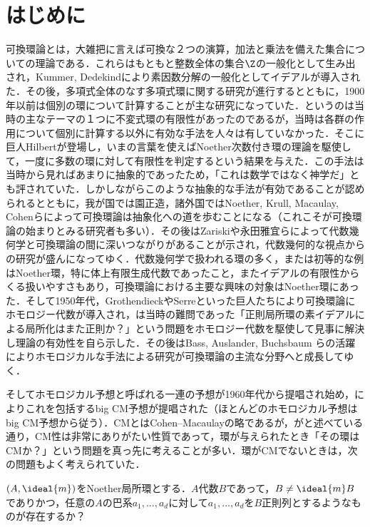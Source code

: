 \documentclass[autodetect-engine,dvi=dvipdfmx,ja=standard,japaram={units}]{bxjsarticle} %
\begin{document}
	\nocite{*}
	\newpage
	\part*{はじめに}
可換環論とは，大雑把に言えば可換な２つの演算，加法と乗法を備えた集合についての理論である．これらはもともと整数全体の集合$\Z$の一般化として生み出され，Kummer, Dedekindにより素因数分解の一般化としてイデアルが導入された．その後，多項式全体のなす多項式環に関する研究が進行するとともに，1900年以前は個別の環について計算することが主な研究になっていた．というのは当時の主なテーマの１つに不変式環の有限性があったのであるが，当時は各群の作用について個別に計算する以外に有効な手法を人々は有していなかった．そこに巨人Hilbertが登場し，いまの言葉を使えばNoether次数付き環の理論を駆使して，一度に多数の環に対して有限性を判定するという結果を与えた．この手法は当時から見ればあまりに抽象的であったため，「これは数学ではなく神学だ」とも評されていた．しかしながらこのような抽象的な手法が有効であることが認められるとともに，我が国では園正造，諸外国ではNoether, Krull, Macaulay, Cohenらによって可換環論は抽象化への道を歩むことになる（これこそが可換環論の始まりとみる研究者も多い）．その後はZariskiや永田雅宜らによって代数幾何学と可換環論の間に深いつながりがあることが示され，代数幾何的な視点からの研究が盛んになってゆく．代数幾何学で扱われる環の多く，または初等的な例はNoether環，特に体上有限生成代数であったこと，またイデアルの有限性からくる扱いやすさもあり，可換環論における主要な興味の対象はNoether環にあった．そして1950年代，GrothendieckやSerreといった巨人たちにより可換環論にホモロジー代数が導入され，\cite{Serre1956}は当時の難問であった「正則局所環の素イデアルによる局所化はまた正則か？」という問題をホモロジー代数を駆使して見事に解決し理論の有効性を自ら示した．その後はBass, Auslander, Buchsbaum らの活躍によりホモロジカルな手法による研究が可換環論の主流な分野へと成長してゆく．

そしてホモロジカル予想と呼ばれる一連の予想が1960年代から提唱され始め，\cite{Hochster1975}によりこれを包括するbig CM予想が提唱された（ほとんどのホモロジカル予想はbig CM予想から従う）．CMとはCohen--Macaulayの略であるが，\cite{Hochster1991}がと述べている通り，CM性は非常にありがたい性質であって，環が与えられたとき「その環はCMか？」という問題を真っ先に考えることが多い．環がCMでないときは，次の問題もよく考えられていた．
\begin{prob} 
	$(A,\ideal{m})$をNoether局所環とする．$A$代数$B$であって，$B\neq\ideal{m}B$でありかつ，任意の$A$の巴系$a_1,\dots,a_d$に対して$a_1,\dots,a_d$を$B$正則列とするようなものが存在するか？
\end{prob}
	
\end{document}
